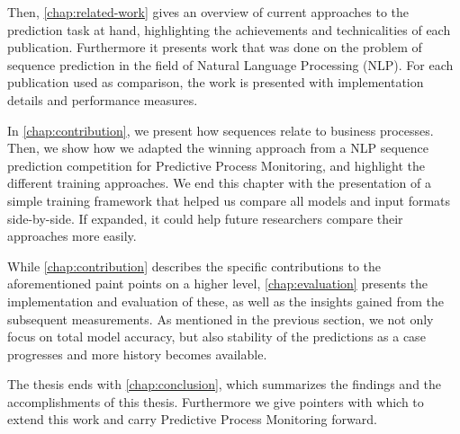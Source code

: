 Then, \autoref{chap:related-work} gives an overview of current approaches to the prediction task at hand, highlighting the achievements and technicalities of each publication. Furthermore it presents work that was done on the problem of sequence prediction in the field of Natural Language Processing (NLP). For each publication used as comparison, the work is presented with implementation details and performance measures.

In \autoref{chap:contribution}, we present how sequences relate to business processes. Then, we show how we adapted the winning approach from a NLP sequence prediction competition for Predictive Process Monitoring, and highlight the different training approaches. We end this chapter with the presentation of a simple training framework that helped us compare all models and input formats side-by-side. If expanded, it could help future researchers compare their approaches more easily.

While \autoref{chap:contribution} describes the specific contributions to the aforementioned paint points on a higher level, \autoref{chap:evaluation} presents the implementation and evaluation of these, as well as the insights gained from the subsequent measurements. As mentioned in the previous section, we not only focus on total model accuracy, but also stability of the predictions as a case progresses and more history becomes available.

The thesis ends with \autoref{chap:conclusion}, which summarizes the findings and the accomplishments of this thesis. Furthermore we give pointers with which to extend this work and carry Predictive Process Monitoring forward.